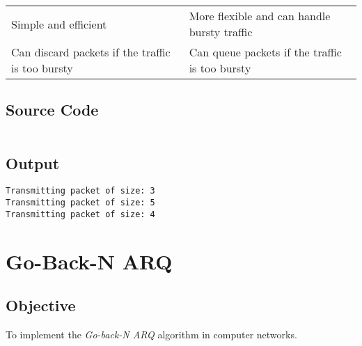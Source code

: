 \documentclass{korigamik}
\begin{document}
\begin{table}[!ht]
\begin{tabular}{p{2.8in}|p{2.8in}}
		Simple and efficient                                                                                                                                                                                              & More flexible and can handle bursty traffic                                                                                                                                                                                                                                      \\
		Can discard packets if the traffic is too bursty                                                                                                                                                                  & Can queue packets if the traffic is too bursty                                                                                                                                                                                                                                   \\
	\end{tabular}
\end{table}

\pagebreak


\subsection{Source Code}

\inputminted[firstline=5, fontsize=\footnotesize]{cpp}{code/leakybucket.cpp}

\subsection{Output}

\begin{lstlisting}[style=output]
Transmitting packet of size: 3
Transmitting packet of size: 5
Transmitting packet of size: 4
\end{lstlisting}


\section{Go-Back-N ARQ}
\label{sec:Windowing Protocols}

\subsection{Objective}
To implement the \textit{Go-back-N ARQ} algorithm in computer networks.
\end{document}

